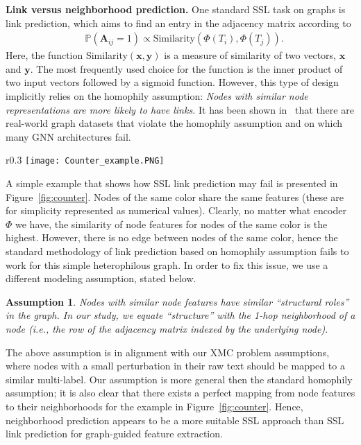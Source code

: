 \documentclass{article} \usepackage{iclr2022_conference,times}
\newtheorem{assumption}[theorem]{Assumption}
\begin{document}
\textbf{Link versus neighborhood prediction. }
One standard SSL task on graphs is link prediction, which aims to find an entry in the adjacency matrix according to
\begin{align}
	& \mathbb{P}\left(\mathbf{A}_{ij}=1\right) \propto \text{Similarity}\left(\Phi(T_i),\Phi(T_j)\right).
\end{align}
Here, the function Similarity$(\mathbf{x},\mathbf{y})$ is a measure of similarity of two vectors, $\mathbf{x}$ and $\mathbf{y}$. The most frequently used choice for the function is the inner product of two input vectors followed by a sigmoid function. However, this type of design implicitly relies on the homophily assumption: \emph{Nodes with similar node representations are more likely to have links.} It has been shown in~\cite{pei2020geom,chien2020adaptive,zhu2020beyond,lim2021new} that there are real-world graph datasets that violate the homophily assumption and on which many GNN architectures fail. 
\begin{wrapfigure}{r}{0.3\textwidth}
    \centering
    \vspace{-\intextsep}
    \texttt{[image: Counter\_example.PNG]}
    \vspace{-0.8cm}
  \caption{A counter-example for standard link prediction methodology.}
  \label{fig:counter}
  \vspace{-\intextsep}
\end{wrapfigure}
A simple example that shows how SSL link prediction may fail is presented in Figure~\ref{fig:counter}. Nodes of the same color share the same features (these are for simplicity represented as numerical values). Clearly, no matter what encoder $\Phi$ we have, the similarity of node features for nodes of the same color is the highest. However, there is no edge between nodes of the same color, hence the standard methodology of link prediction based on homophily assumption fails to work for this simple heterophilous graph. In order to fix this issue, we use a different modeling assumption, stated below.
\begin{assumption}\label{conj:1}
Nodes with similar node features have similar ``structural roles'' in the graph. In our study, we equate ``structure'' with the 1-hop neighborhood of a node (i.e., the row of the adjacency matrix indexed by the underlying node).
\end{assumption}
The above assumption is in alignment with our XMC problem assumptions, where nodes with a small perturbation in their raw text should be mapped to a similar multi-label. Our assumption is more general then the standard homophily assumption; it is also clear that there exists a perfect mapping from node features to their neighborhoods for the example in Figure~\ref{fig:counter}. Hence, neighborhood prediction appears to be a more suitable SSL approach than SSL link prediction for graph-guided feature extraction.
\end{document}
